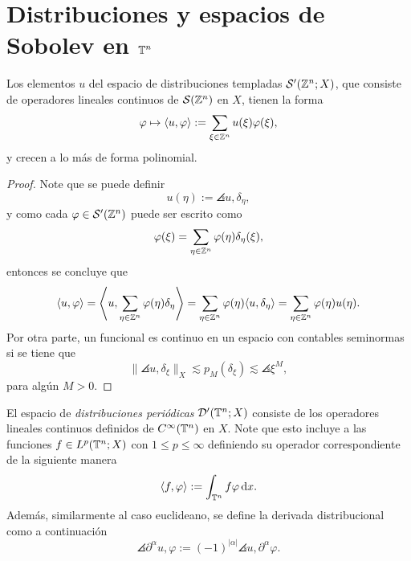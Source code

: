 \section{Distribuciones y espacios de Sobolev en $\mathbb{T}^n$}
\begin{theorem}
	Los elementos $u$ del espacio de distribuciones templadas $\mathcal{S}'(\mathbb{Z}^n;X)$, que consiste de operadores lineales continuos de $\mathcal{S}(\mathbb{Z}^n)$ en $X$,  tienen la forma 
	\begin{equation*}
		\varphi \mapsto \langle u, \varphi\rangle := \sum_{\xi\in\mathbb{Z}^n} u(\xi)\varphi(\xi),
	\end{equation*}
	y crecen a lo más de forma polinomial.
\end{theorem} 
\begin{proof}
	Note que se puede definir 
	\begin{equation*}
		u(\eta) := \angles{u, \delta_\eta},
	\end{equation*}
	y como cada $\varphi\in\mathcal{S}'(\mathbb{Z}^n)$ puede ser escrito como 
	\begin{equation*}
		\varphi(\xi) = \sum_{\eta\in\mathbb{Z}^n} \varphi(\eta)\delta_\eta(\xi),
	\end{equation*}
	entonces se concluye que 
	\begin{equation*}
		\langle u, \varphi\rangle = \left\langle u, \sum_{\eta\in\mathbb{Z}^n}  \varphi(\eta)\delta_\eta \right\rangle = \sum_{\eta\in\mathbb{Z}^n}  \varphi(\eta)\langle u, \delta_\eta\rangle = \sum_{\eta\in\mathbb{Z}^n}  \varphi(\eta)u(\eta).
	\end{equation*}
	Por otra parte, un funcional es continuo en un espacio con contables seminormas si se tiene que 
	\begin{equation*}
		\|\angles{u, \delta_\xi}\|_X \lesssim p_M(\delta_\xi) \lesssim \angles{\xi}^M,
	\end{equation*}
	para algún $M>0$.
\end{proof}
\begin{definition}
	El espacio de \textit{distribuciones periódicas} $\mathcal{D}'(\mathbb{T}^n;X)$ consiste de los operadores lineales continuos definidos de $C^\infty(\mathbb{T}^n)$ en $X$. Note que esto incluye a las funciones $f\in L^p(\mathbb{T}^n;X)$ con $1\leq p\leq\infty$ definiendo su operador correspondiente de la siguiente manera
	\begin{equation*}
		\langle f, \varphi\rangle := \int_{\mathbb{T}^n} f\varphi\mathop{}\!\mathrm{d} x.
	\end{equation*}
	Además, similarmente al caso euclideano, se define la derivada distribucional como a continuación 
	\begin{equation*}
		\angles{\partial^\alpha u, \varphi} := (-1)^{|\alpha|}\angles{u, \partial^\alpha\varphi}.
	\end{equation*}
\end{definition}
